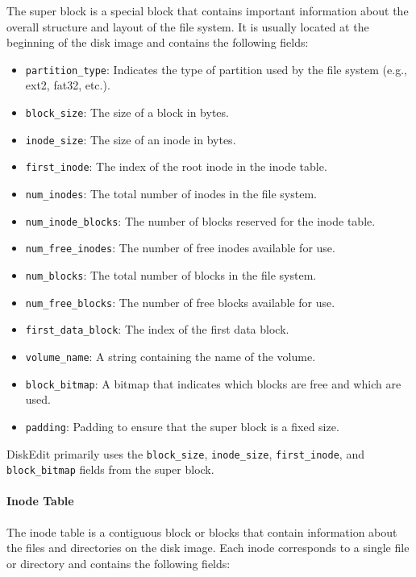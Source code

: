 \documentclass{article}
\begin{document}
The super block is a special block that contains important information about the overall structure and layout of the file system. It is usually located at the beginning of the disk image and contains the following fields:

\begin{itemize}
    \item \texttt{partition\_type}: Indicates the type of partition used by the file system (e.g., ext2, fat32, etc.).
    \item \texttt{block\_size}: The size of a block in bytes.
    \item \texttt{inode\_size}: The size of an inode in bytes.
    \item \texttt{first\_inode}: The index of the root inode in the inode table.
    \item \texttt{num\_inodes}: The total number of inodes in the file system.
    \item \texttt{num\_inode\_blocks}: The number of blocks reserved for the inode table.
    \item \texttt{num\_free\_inodes}: The number of free inodes available for use.
    \item \texttt{num\_blocks}: The total number of blocks in the file system.
    \item \texttt{num\_free\_blocks}: The number of free blocks available for use.
    \item \texttt{first\_data\_block}: The index of the first data block.
    \item \texttt{volume\_name}: A string containing the name of the volume.
    \item \texttt{block\_bitmap}: A bitmap that indicates which blocks are free and which are used.
    \item \texttt{padding}: Padding to ensure that the super block is a fixed size.
\end{itemize}

DiskEdit primarily uses the \texttt{block\_size}, \texttt{inode\_size}, \texttt{first\_inode}, and \texttt{block\_bitmap} fields from the super block.

\paragraph{Inode Table}

The inode table is a contiguous block or blocks that contain information about the files and directories on the disk image. Each inode corresponds to a single file or directory and contains the following fields:
\end{document}
